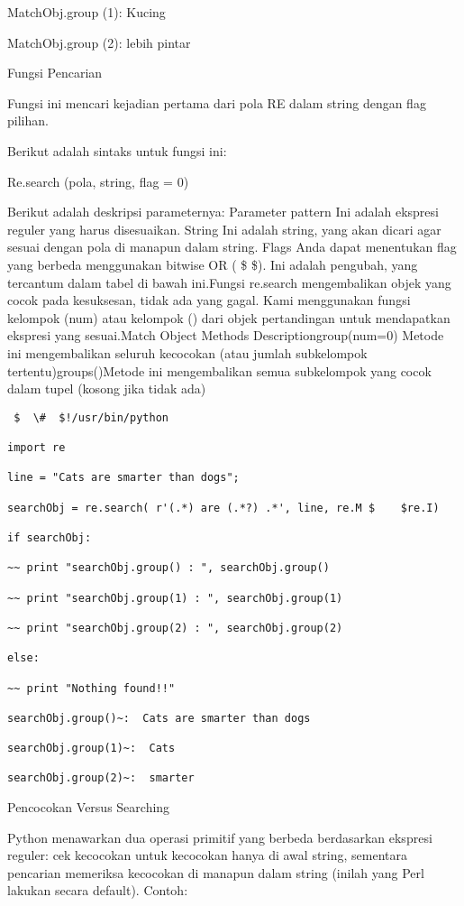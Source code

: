 \begin {enumerate}
\begin {enumerate}
MatchObj.group (1): Kucing

MatchObj.group (2): lebih pintar

Fungsi Pencarian

Fungsi ini mencari kejadian pertama dari pola RE dalam string dengan flag pilihan.

Berikut adalah sintaks untuk fungsi ini:

Re.search (pola, string, flag = 0)

Berikut adalah deskripsi parameternya:
Parameter pattern Ini adalah ekspresi reguler yang harus disesuaikan. String Ini adalah string, yang akan dicari agar sesuai dengan pola di manapun dalam string. Flags Anda dapat menentukan flag yang berbeda menggunakan bitwise OR ( \$    \$). Ini adalah pengubah, yang tercantum dalam tabel di bawah ini.Fungsi re.search mengembalikan objek yang cocok pada kesuksesan, tidak ada yang gagal. Kami menggunakan fungsi kelompok (num) atau kelompok () dari objek pertandingan untuk mendapatkan ekspresi yang sesuai.Match Object Methods Descriptiongroup(num=0) Metode ini mengembalikan seluruh kecocokan (atau jumlah subkelompok tertentu)groups()Metode ini mengembalikan semua subkelompok yang cocok dalam tupel (kosong jika tidak ada)

\begin{verbatim}
 $  \#  $!/usr/bin/python

import re

line = "Cats are smarter than dogs";

searchObj = re.search( r'(.*) are (.*?) .*', line, re.M $    $re.I)

if searchObj:

~~ print "searchObj.group() : ", searchObj.group()

~~ print "searchObj.group(1) : ", searchObj.group(1)

~~ print "searchObj.group(2) : ", searchObj.group(2)

else:

~~ print "Nothing found!!"

searchObj.group()~:  Cats are smarter than dogs

searchObj.group(1)~:  Cats

searchObj.group(2)~:  smarter
\end{verbatim}

Pencocokan Versus Searching

Python menawarkan dua operasi primitif yang berbeda berdasarkan ekspresi reguler: cek kecocokan untuk kecocokan hanya di awal string, sementara pencarian memeriksa kecocokan di manapun dalam string (inilah yang Perl lakukan secara default).
Contoh:


\end{enumerate}
\end{enumerate}
